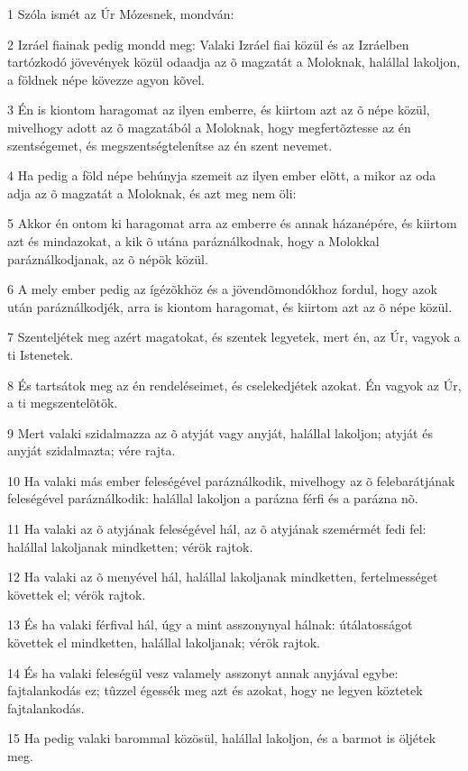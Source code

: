 \par 1 Szóla ismét az Úr Mózesnek, mondván:
\par 2 Izráel fiainak pedig mondd meg: Valaki Izráel fiai közül és az Izráelben tartózkodó jövevények közül odaadja az õ magzatát a Moloknak, halállal lakoljon, a földnek népe kövezze agyon kõvel.
\par 3 Én is kiontom haragomat az ilyen emberre, és kiirtom azt az õ népe közül, mivelhogy adott az õ magzatából a Moloknak, hogy megfertõztesse az én szentségemet, és megszentségtelenítse az én szent nevemet.
\par 4 Ha pedig a föld népe behúnyja szemeit az ilyen ember elõtt, a mikor az oda adja az õ magzatát a Moloknak, és azt meg nem öli:
\par 5 Akkor én ontom ki haragomat arra az emberre és annak házanépére, és kiirtom azt és mindazokat, a kik õ utána paráználkodnak, hogy a Molokkal paráználkodjanak, az õ népök közül.
\par 6 A mely ember pedig az ígézõkhöz és a jövendõmondókhoz fordul, hogy azok után paráználkodjék, arra is kiontom haragomat, és kiirtom azt az õ népe közül.
\par 7 Szenteljétek meg azért magatokat, és szentek legyetek, mert én, az Úr, vagyok a ti Istenetek.
\par 8 És tartsátok meg az én rendeléseimet, és cselekedjétek azokat. Én vagyok az Úr, a ti megszentelõtök.
\par 9 Mert valaki szidalmazza az õ atyját vagy anyját, halállal lakoljon; atyját és anyját szidalmazta; vére rajta.
\par 10 Ha valaki más ember feleségével paráználkodik, mivelhogy az õ felebarátjának feleségével paráználkodik: halállal lakoljon a parázna férfi és a parázna nõ.
\par 11 Ha valaki az õ atyjának feleségével  hál, az õ atyjának szemérmét fedi fel: halállal lakoljanak mindketten; vérök rajtok.
\par 12 Ha valaki az õ menyével hál, halállal lakoljanak mindketten, fertelmességet követtek el; vérök rajtok.
\par 13 És ha valaki férfival hál, úgy a mint asszonynyal hálnak: útálatosságot követtek el mindketten, halállal lakoljanak; vérök rajtok.
\par 14 És ha valaki feleségül vesz valamely asszonyt annak anyjával egybe: fajtalankodás ez; tûzzel égessék meg azt és azokat, hogy ne legyen köztetek fajtalankodás.
\par 15 Ha pedig valaki barommal közösül, halállal lakoljon, és a barmot is öljétek meg.
